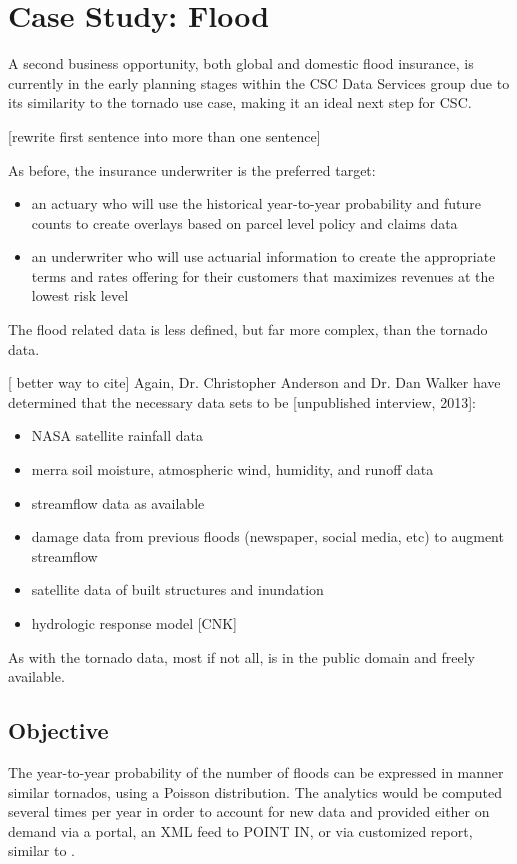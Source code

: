 \section{Case Study: Flood}
A second business opportunity, both global and domestic flood insurance, is currently in the early planning stages within the CSC Data Services group due to its similarity to the tornado use case, making it an ideal next step for CSC. 

[rewrite first sentence into more than one sentence]


 As before, the  insurance underwriter is the preferred target:
\begin{itemize}
    \item an actuary who will use the historical year-to-year probability and future counts to create overlays based on parcel level policy and claims data
    \item an underwriter who will use actuarial information to create the appropriate terms and rates offering for their customers that maximizes revenues at the lowest risk level
\end{itemize}
The flood related data is less defined, but far more complex, than the tornado data. 

[ better way to cite]
Again, Dr. Christopher Anderson and Dr. Dan Walker have determined that the necessary data sets to be [unpublished interview, 2013]:
\begin{itemize}
    \item NASA satellite rainfall data
    \item \gls{merra} soil moisture, atmospheric wind,  humidity, and runoff data
    \item streamflow data as available
    \item damage data from previous floods (newspaper, social media, etc) to augment streamflow
    \item satellite data of built structures and inundation
    \item hydrologic response model [CNK]
\end{itemize}
As with the tornado data, most if not all, is in the public domain and freely available.
\subsection{Objective}
The year-to-year probability of the number of floods can be expressed in manner similar tornados, using a Poisson distribution. The analytics would be computed several times per year in order to account for new data and provided either on demand via a portal, an XML feed to POINT IN, or via customized  report, similar to \climatedge.

